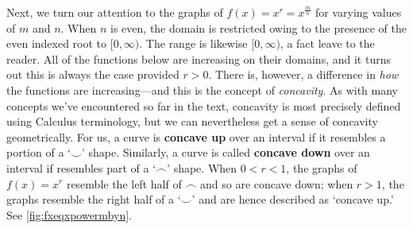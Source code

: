 Next, we turn our attention to the graphs of $f(x) =x^r =  x^{\frac{m}{n}}$ for varying values of $m$ and $n$.  When $n$ is even, the domain is restricted owing to the presence of the even indexed root to $[0, \infty)$. The range is likewise $[0, \infty)$, a fact leave to the reader.  All of the functions below are increasing on their domains, and it turns out this is always the case provided $r>0$.  There is, however, a difference in \textit{how} the functions are increasing---and this is the concept of \textit{concavity}.  As with many concepts we've encountered so far in the text,  concavity is most precisely defined using Calculus terminology,  but we can nevertheless get a sense of concavity geometrically.   For us,  a curve is  \textbf{concave up} over an interval if it resembles a  portion of a `$\smile$' shape.  Similarly, a curve is called  \textbf{concave down} over an interval if  resembles part of a `$\frown$' shape. When $0 < r < 1$, the graphs of $f(x) = x^r$ resemble the left half of $\frown$ and so are concave down;  when $r>1$, the graphs resemble the right half of a `$\smile$' and are hence described as `concave up.' See \autoref{fig:fxeqxpowermbyn}.

